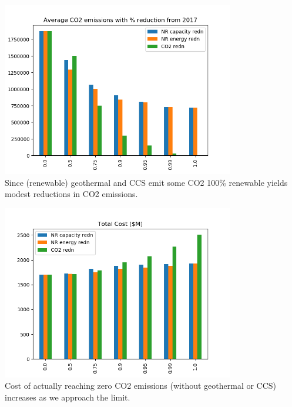 \documentclass[xcolor=dvipsnames]{beamer}
\begin{document}
\begin{frame}
  \centering
  \includegraphics[width=4.0in]{includes/TotalCarbonv20.png} \\
  Since (renewable) geothermal and CCS emit some CO2 100\% renewable yields modest reductions in CO2 emissions.
\end{frame}

\begin{frame}

  \centering
  \includegraphics[width=4.0in]{includes/TotalCostMv20.png} \\
  Cost of actually reaching zero CO2 emissions (without geothermal or CCS) increases as we approach the limit.
\end{frame}
\end{document}
